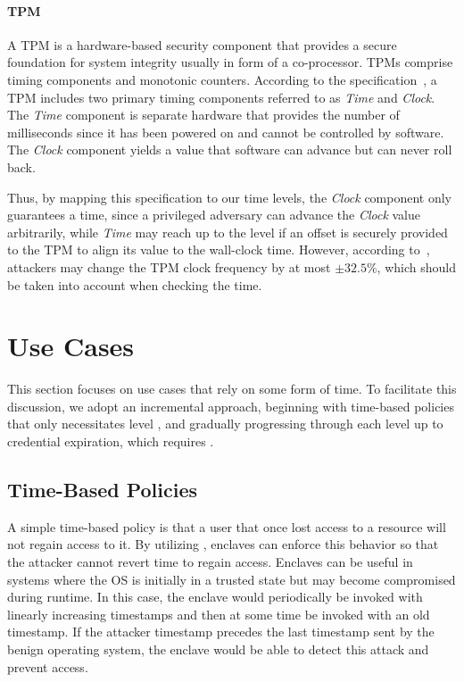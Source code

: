 \paragraph{TPM}

A \ac{TPM} is a hardware-based security component that provides a secure
foundation for system integrity usually in form of a co-processor. \acp{TPM}
comprise timing components and monotonic counters. According to the
specification~\cite{tpmdoc}, a \ac{TPM} includes two primary timing
components referred to as \emph{Time} and \emph{Clock}. The \emph{Time}
component is separate hardware that provides the number of milliseconds since it
has been powered on and cannot be controlled by software. The \emph{Clock}
component yields a value that software can advance but can never roll back. 

Thus, by mapping this specification to our time levels, the \emph{Clock}
component only guarantees a \Tone{} time, since a privileged adversary can
advance the \emph{Clock} value arbitrarily, while \emph{Time} may reach up to
the \Tfour{} level if an offset is securely provided to the \ac{TPM} to align
its value to the wall-clock time. However, according to~\cite{tpmdoc},
attackers may change the \ac{TPM} clock frequency by at most $\pm{}32.5\%$,
which should be taken into account when checking the time.

\section{Use Cases}

This section focuses on use cases that rely on some form of time. To facilitate
this discussion, we adopt an incremental approach, beginning with time-based
policies that only necessitates level \Tone, and gradually progressing through
each level up to credential expiration, which requires \Tfour.

\subsection{Time-Based Policies}
A simple time-based policy is that a user that once lost access to a resource
will not regain access to it. By utilizing \Tone, enclaves can enforce this
behavior so that the attacker cannot revert time to regain access. Enclaves can
be useful in systems where the OS is initially in a trusted state but may become
compromised during runtime. In this case, the enclave would periodically be
invoked with linearly increasing timestamps and then at some time be invoked
with an old timestamp. If the attacker timestamp precedes the last timestamp
sent by the benign operating system, the enclave would be able to detect this
attack and prevent access.

